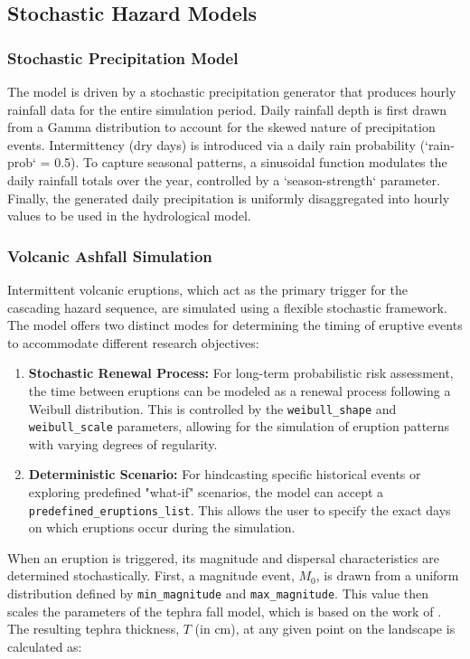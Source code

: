 \documentclass[12pt, a4paper]{article}
\begin{document}
\subsection{Stochastic Hazard Models}

\subsubsection{Stochastic Precipitation Model}
The model is driven by a stochastic precipitation generator that produces hourly rainfall data for the entire simulation period. Daily rainfall depth is first drawn from a Gamma distribution to account for the skewed nature of precipitation events. Intermittency (dry days) is introduced via a daily rain probability (`rain-prob` = 0.5). To capture seasonal patterns, a sinusoidal function modulates the daily rainfall totals over the year, controlled by a `season-strength` parameter. Finally, the generated daily precipitation is uniformly disaggregated into hourly values to be used in the hydrological model.

\subsubsection{Volcanic Ashfall Simulation}

Intermittent volcanic eruptions, which act as the primary trigger for the cascading hazard sequence, are simulated using a flexible stochastic framework. The model offers two distinct modes for determining the timing of eruptive events to accommodate different research objectives:
\begin{enumerate}
    \item \textbf{Stochastic Renewal Process:} For long-term probabilistic risk assessment, the time between eruptions can be modeled as a renewal process following a Weibull distribution. This is controlled by the \texttt{weibull\_shape} and \texttt{weibull\_scale} parameters, allowing for the simulation of eruption patterns with varying degrees of regularity.
    \item \textbf{Deterministic Scenario:} For hindcasting specific historical events or exploring predefined "what-if" scenarios, the model can accept a \texttt{predefined\_eruptions\_list}. This allows the user to specify the exact days on which eruptions occur during the simulation.
\end{enumerate}

When an eruption is triggered, its magnitude and dispersal characteristics are determined stochastically. First, a magnitude event, \(M_0\), is drawn from a uniform distribution defined by \texttt{min\_magnitude} and \texttt{max\_magnitude}. This value then scales the parameters of the tephra fall model, which is based on the work of \citet{Gonzalez-Mellado2010}. The resulting tephra thickness, \(T\) (in cm), at any given point on the landscape is calculated as:
\end{document}
